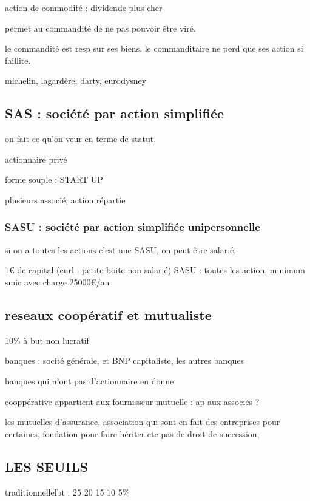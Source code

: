 \documentclass[a4paper,12pt]{article}
\begin{document}
action de commodité : dividende plus cher

permet au commandité de ne pas pouvoir être viré.


le commandité est resp sur ses biens.
le commanditaire ne perd que ses action si faillite.





michelin, lagardère,  darty, eurodysney

\subsection{SAS : société par action simplifiée}



on fait ce qu'on veur en terme de statut.

actionnaire privé

forme souple : START UP

plusieurs associé, action répartie

 \subsubsection{SASU : société par action simplifiée unipersonnelle}

si on a toutes les actions c'est une SASU, on peut être salarié,

1€ de capital (eurl : petite boite non salarié)
SASU : toutes les action, minimum smic avec charge 25000€/an


\subsection{reseaux coopératif et mutualiste}

10\% à but non lucratif



banques : socité générale, et BNP capitaliste, les autres banques

banques qui n'ont pas d'actionnaire en donne 

cooppérative appartient aux fournisseur
mutuelle : ap aux associés ?

les mutuelles d'assurance, association qui sont en fait des entreprises pour certaines, 
fondation pour faire hériter etc pas de droit de succession, 


\subsection{LES SEUILS}
traditionnellelbt : 25 20 15 10 5\%
\end{document}
